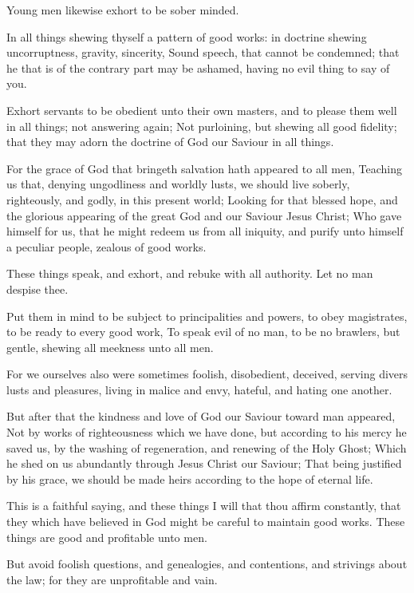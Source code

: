 \Verse Young men likewise exhort to be sober minded.

\Verse In all things shewing thyself a pattern of good works: in doctrine shewing uncorruptness, gravity, sincerity, \Verse Sound speech, that cannot be condemned; that he that is of the contrary part may be ashamed, having no evil thing to say of you.

\Verse Exhort servants to be obedient unto their own masters, and to please them well in all things; not answering again; \Verse Not purloining, but shewing all good fidelity; that they may adorn the doctrine of God our Saviour in all things.

\Verse For the grace of God that bringeth salvation hath appeared to all men, \Verse Teaching us that, denying ungodliness and worldly lusts, we should live soberly, righteously, and godly, in this present world; \Verse Looking for that blessed hope, and the glorious appearing of the great God and our Saviour Jesus Christ; \Verse Who gave himself for us, that he might redeem us from all iniquity, and purify unto himself a peculiar people, zealous of good works.

\Verse These things speak, and exhort, and rebuke with all authority.  Let no man despise thee.


\Chapter
\Verse Put them in mind to be subject to principalities and powers, to obey magistrates, to be ready to every good work, \Verse To speak evil of no man, to be no brawlers, but gentle, shewing all meekness unto all men.

\Verse For we ourselves also were sometimes foolish, disobedient, deceived, serving divers lusts and pleasures, living in malice and envy, hateful, and hating one another.

\Verse But after that the kindness and love of God our Saviour toward man appeared, \Verse Not by works of righteousness which we have done, but according to his mercy he saved us, by the washing of regeneration, and renewing of the Holy Ghost; \Verse Which he shed on us abundantly through Jesus Christ our Saviour; \Verse That being justified by his grace, we should be made heirs according to the hope of eternal life.

\Verse This is a faithful saying, and these things I will that thou affirm constantly, that they which have believed in God might be careful to maintain good works. These things are good and profitable unto men.

\Verse But avoid foolish questions, and genealogies, and contentions, and strivings about the law; for they are unprofitable and vain.

